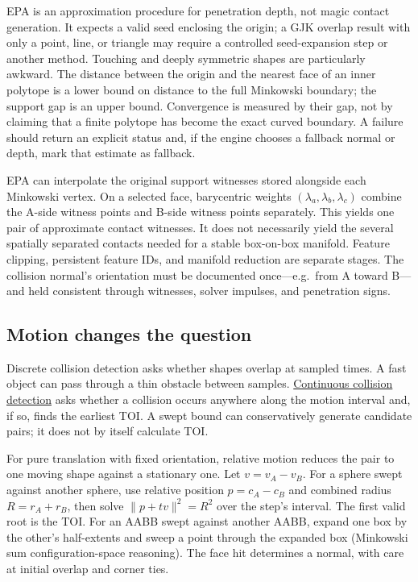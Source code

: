 EPA is an approximation procedure for penetration depth, not magic contact generation. It expects a valid seed enclosing the origin; a GJK overlap result with only a point, line, or triangle may require a controlled seed-expansion step or another method. Touching and deeply symmetric shapes are particularly awkward. The distance between the origin and the nearest face of an inner polytope is a lower bound on distance to the full Minkowski boundary; the support gap is an upper bound. Convergence is measured by their gap, not by claiming that a finite polytope has become the exact curved boundary. A failure should return an explicit status and, if the engine chooses a fallback normal or depth, mark that estimate as fallback.

EPA can interpolate the original support witnesses stored alongside each Minkowski vertex. On a selected face, barycentric weights \((\lambda_a,\lambda_b,\lambda_c)\) combine the A-side witness points and B-side witness points separately. This yields one pair of approximate contact witnesses. It does not necessarily yield the several spatially separated contacts needed for a stable box-on-box manifold. Feature clipping, persistent feature IDs, and manifold reduction are separate stages. The collision normal's orientation must be documented once---e.g.~from A toward B---and held consistent through witnesses, solver impulses, and penetration signs.

\subsection{Motion changes the question}\label{03-visual-computing-i-ch020-motion-changes-the-question}

\hypertarget{03-visual-computing-i-ch020-motion-changes-the-question}{}

Discrete collision detection asks whether shapes overlap at sampled times. A fast object can pass through a thin obstacle between samples. \hyperref[appendix-66956ed6c753]{Continuous collision detection} asks whether a collision occurs anywhere along the motion interval and, if so, finds the earliest TOI. A swept bound can conservatively generate candidate pairs; it does not by itself calculate TOI.

For pure translation with fixed orientation, relative motion reduces the pair to one moving shape against a stationary one. Let \(v=v_A-v_B\). For a sphere swept against another sphere, use relative position \(p=c_A-c_B\) and combined radius \(R=r_A+r_B\), then solve \(\|p+tv\|^2=R^2\) over the step's interval. The first valid root is the TOI. For an AABB swept against another AABB, expand one box by the other's half-extents and sweep a point through the expanded box (Minkowski sum configuration-space reasoning). The face hit determines a normal, with care at initial overlap and corner ties.

